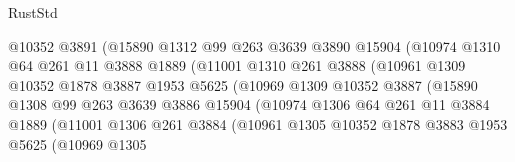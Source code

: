 \begin{lexlean}{RustStd}
\begin{coremodule}
                              @10352
                              @3891
                              (@15890
                                @1312
                                @99
                                @263
                                @3639
                                @3890
                                @15904
                                (@10974
                                  @1310
                                  @64
                                  @261
                                  @11
                                  @3888
                                  @1889
                                  (@11001
                                    @1310
                                    @261
                                    @3888
                                    (@10961
                                      @1309
                                      @10352
                                      @1878
                                      @3887
                                      @1953
                                      @5625
                                      (@10969
                                        @1309
                                        @10352
                                        @3887
                                        (@15890
                                          @1308
                                          @99
                                          @263
                                          @3639
                                          @3886
                                          @15904
                                          (@10974
                                            @1306
                                            @64
                                            @261
                                            @11
                                            @3884
                                            @1889
                                            (@11001
                                              @1306
                                              @261
                                              @3884
                                              (@10961
                                                @1305
                                                @10352
                                                @1878
                                                @3883
                                                @1953
                                                @5625
                                                (@10969
                                                  @1305

\end{coremodule}
\end{lexlean}
